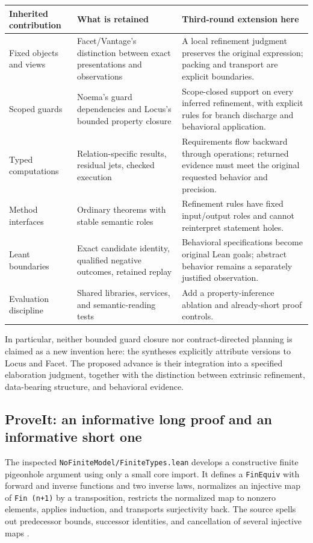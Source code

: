 \documentclass[11pt,letterpaper]{article}
\newcommand{\code}[1]{\nolinkurl{#1}}
\theoremstyle{remark}
\begin{document}
\begin{center}\small
\begin{tabularx}{\textwidth}{@{}P{1.35in}Y Y@{}}
\toprule
Inherited contribution & What is retained & Third-round extension here\\
\midrule
Fixed objects and views & Facet/Vantage's distinction between exact
presentations and observations & A local refinement judgment preserves the
original expression; packing and transport are explicit boundaries.\\
Scoped guards & Noema's guard dependencies and Locus's bounded property closure
& Scope-closed support on every inferred refinement, with explicit rules for
branch discharge and behavioral application.\\
Typed computations & Relation-specific results, residual jets, checked
execution & Requirements flow backward through operations; returned evidence
must meet the original requested behavior and precision.\\
Method interfaces & Ordinary theorems with stable semantic roles & Refinement
rules have fixed input/output roles and cannot reinterpret statement holes.\\
Leant boundaries & Exact candidate identity, qualified negative outcomes,
retained replay & Behavioral specifications become original Lean goals;
abstract behavior remains a separately justified observation.\\
Evaluation discipline & Shared libraries, services, and semantic-reading tests
& Add a property-inference ablation and already-short proof controls.\\
\bottomrule
\end{tabularx}
\end{center}

In particular, neither bounded guard closure nor contract-directed planning is
claimed as a new invention here: the syntheses explicitly attribute versions
to Locus and Facet. The proposed advance is their integration into a specified
elaboration judgment, together with the distinction between extrinsic
refinement, data-bearing structure, and behavioral evidence.

\subsection{ProveIt: an informative long proof and an informative short one}
The inspected \code{NoFiniteModel/FiniteTypes.lean} develops a constructive
finite pigeonhole argument using only a small core import. It defines a
\code{FinEquiv} with forward and inverse functions and two inverse laws,
normalizes an injective map of \code{Fin (n+1)} by a transposition, restricts
the normalized map to nonzero elements, applies induction, and transports
surjectivity back. The source spells out predecessor bounds, successor
identities, and cancellation of several injective maps \cite{finite}.
\end{document}
